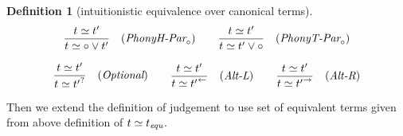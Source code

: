 \documentclass[12pt]{article}
\newtheorem{Definition}{Definition}[section]
\begin{document}
\begin{Definition}[intuitionistic equivalence over canonical terms]
\begin{displaymath}
\begin{array}{c}
      \begin{array}{ll}
        \begin{array}{rl}
          \dfrac{ t \simeq t' }{
            t \simeq \circ \vee t'
          }  &  (\text{\it PhonyH-Par}_\circ)
        \end{array}
        & \begin{array}{rl}
            \dfrac{ t \simeq t' }{
              t \simeq t' \vee \circ
            }  &  (\text{\it PhonyT-Par}_\circ)
          \end{array}
      \end{array}  \\
      \\
      
      \begin{array}{rll}
        \begin{array}{rl}
          \dfrac{
            t \simeq t'
          }{
            t \simeq {t'}^?
          }  &  (\text{\it Optional})
        \end{array}

        & \begin{array}{rl}
            \dfrac{
              t \simeq t'
            }{
              t \simeq {t'}^\leftarrow
            }  &  (\text{\it Alt-L})
          \end{array}
        
        & \begin{array}{rl}
            \dfrac{
              t \simeq t'
            }{
              t \simeq {t'}^\rightarrow
            }  &  (\text{\it Alt-R})
          \end{array}
      \end{array}
      
    \end{array}
  \end{displaymath}
\end{Definition}


\vspace{\baselineskip}
Then we extend the definition of judgement to use set of equivalent terms
given from above definition of $t \simeq t_{\text{\it equ}}$.
\end{document}
